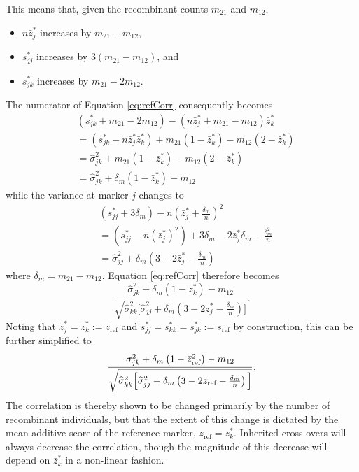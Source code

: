 \documentclass[sts]{imsart}
\begin{document}
This means that, given the recombinant counts $m_{21}$ and $m_{12}$,
\begin{itemize}
\item $n \bar{z}_{j}^*$ increases by $m_{21} - m_{12}$,
\item $s_{jj}^*$ increases by $3 ( m_{21} - m_{12} )$, and
\item $s_{jk}^*$ increases by $m_{21} - 2 m_{12}$.
\end{itemize}
The numerator of Equation \ref{eq:refCorr} consequently becomes
\begin{eqnarray}
  & \left ( s^*_{jk} + m_{21} - 2 m_{12} \right ) - \left( n \bar{z}_{j}^* + m_{21} - m_{12} \right ) \bar{z}_{k}^* \nonumber\\
  & = \left ( s^*_{jk} - n \bar{z}_{j}^* \bar{z}_{k}^* \right ) + m_{21}(1 - \bar{z}_k^*) - m_{12} (2 - \bar{z}_{k}^*) \nonumber\\
  & = \widehat{\sigma}_{jk}^2 + m_{21} (1 - \bar{z}_k^*) - m_{12}( 2 -  \bar{z}_{k}^*) \nonumber \\
  & = \widehat{\sigma}_{jk}^2 + \delta_m (1 - \bar{z}_k^* ) - m_{12}     
\end{eqnarray}
while the variance at marker $j$ changes to
\begin{eqnarray}
  & \left ( s_{jj}^* + 3\delta_m \right ) -  n \left ( \bar{z}_{j}^* + \frac{\delta_m}{n} \right )^2 \nonumber \\
  & = \left ( s_{jj}^* - n (\bar{z}_{j}^*)^2 \right ) + 3 \delta_m - 2 \bar{z}_{j}^* \delta_m -  \frac{\delta_m^2}{n} \nonumber \\
  & = \widehat{\sigma}_{jj}^2 + \delta_m \left ( 3 - 2 \bar{z}_j^* - \frac{\delta_m}{n} \right )
\end{eqnarray}
where $\delta_m = m_{21} - m_{12}$. Equation \ref{eq:refCorr} therefore becomes
\begin{equation}
  \frac{\widehat{\sigma}_{jk}^2 + \delta_m (1 - \bar{z}_k^* ) - m_{12}}{\sqrt{ \widehat{\sigma}_{kk}^2 \Big [ \widehat{\sigma}_{jj}^2 + \delta_m \left ( 3 - 2 \bar{z}_j^* - \frac{\delta_m}{n} \right ) \Big ]}}.
\end{equation}
Noting that $\bar{z}_j^* = \bar{z}_k^* := \bar{z}_{\text{ref}}$ and $s_{jj}^* = s_{kk}^* = s_{jk}^* := s_{\text{ref}}$ by construction, this can be further simplified to
\begin{equation} \label{eq:crossedCorr}
  \frac{ \sigma_{jk}^2 + \delta_m \left(1 - \bar{z}_{\text{ref}}^2 \right ) - m_{12}}{\sqrt{ \widehat{\sigma}_{kk}^2 \Big [ \widehat{\sigma}_{jj}^2 + \delta_m \left ( 3 - 2 \bar{z}_{\text{ref}} - \frac{\delta_m}{n} \right ) \Big ] }}. \\
\end{equation}
The correlation is thereby shown to be changed primarily by the number of recombinant individuals, but that the extent of this change is dictated by the mean additive score of the reference marker, $\bar{z}_{\text{ref}} = \bar{z}_k^*$. Inherited cross overs will always decrease the correlation, though the magnitude of this decrease will depend on $\bar{z}_k^*$ in a non-linear fashion.
\end{document}
